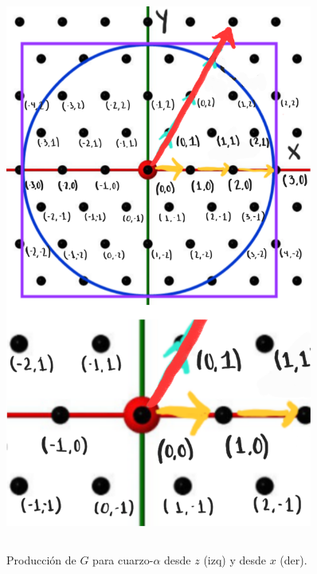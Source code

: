 \documentclass[dvisvgm,11pt,aspectratio=169]{beamer}
\begin{document}
\begin{frame}
\begin{columns}
\begin{column}{0.35\textwidth}
\begin{figure}
\includegraphics[width=0.9\textwidth]{img/gridPoint}
\end{figure}
\end{column}
\end{columns}
\end{frame}

\begin{frame}
\begin{figure}
\caption{Producción de $G$ para cuarzo-$\alpha$ desde $z$ (izq) y desde $x$ (der).}
\end{figure}
\end{frame}
\end{document}

